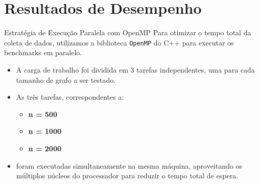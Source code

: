 \section{Resultados de Desempenho}

\begin{frame}{Estratégia de Execução Paralela com OpenMP}
    Para otimizar o tempo total da coleta de dados, utilizamos a biblioteca \texttt{OpenMP} do C++ para executar os benchmarks em paralelo.

    \vspace{0.5cm}

    \begin{itemize}
        \item A carga de trabalho foi dividida em 3 tarefas independentes, uma para cada tamanho de grafo a ser testado.

        \item As três tarefas, correspondentes a:
            \begin{itemize}
                \item \textbf{n = 500}
                \item \textbf{n = 1000}
                \item \textbf{n = 2000}
            \end{itemize}
        
        \item foram executadas simultaneamente na mesma máquina, aproveitando os múltiplos núcleos do processador para reduzir o tempo total de espera.
    \end{itemize}
\end{frame}

